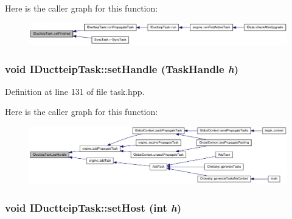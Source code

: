 Here is the caller graph for this function:\nopagebreak
\begin{figure}[H]
\begin{center}
\leavevmode
\includegraphics[width=420pt]{class_i_ductteip_task_abef058563393dffda702745c2503998f_icgraph}
\end{center}
\end{figure}
\hypertarget{class_i_ductteip_task_a1f1f64d2c28f10f03516d242e3674a7f}{
\subsubsection[{setHandle}]{\setlength{\rightskip}{0pt plus 5cm}void IDuctteipTask::setHandle ({\bf TaskHandle} {\em h})}}
\label{class_i_ductteip_task_a1f1f64d2c28f10f03516d242e3674a7f}


Definition at line 131 of file task.hpp.

Here is the caller graph for this function:\nopagebreak
\begin{figure}[H]
\begin{center}
\leavevmode
\includegraphics[width=420pt]{class_i_ductteip_task_a1f1f64d2c28f10f03516d242e3674a7f_icgraph}
\end{center}
\end{figure}
\hypertarget{class_i_ductteip_task_abbdb78cf7dc2e655b704e42fd344f4fb}{
\subsubsection[{setHost}]{\setlength{\rightskip}{0pt plus 5cm}void IDuctteipTask::setHost (int {\em h})}}
\label{class_i_ductteip_task_abbdb78cf7dc2e655b704e42fd344f4fb}


